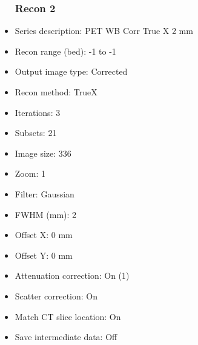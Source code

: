 \documentclass[12pt]{article}
\begin{document}
\begin{itemize}
\subsubsection{Recon 2}
\item Series description: PET WB Corr True X 2 mm
\item Recon range (bed): -1 to -1
\item Output image type: Corrected
\item Recon method: TrueX
\item Iterations: 3
\item Subsets: 21
\item Image size: 336
\item Zoom: 1
\item Filter: Gaussian
\item FWHM (mm): 2
\item Offset X: 0 mm
\item Offset Y: 0 mm
\item Attenuation correction: On (1)
\item Scatter correction: On
\item Match CT slice location: On
\item Save intermediate data: Off
\end{itemize}
\end{document}
